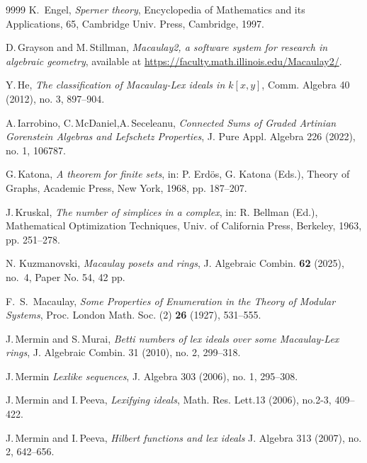 \documentclass[11pt, reqno]{amsart}
\theoremstyle{plain} %
\theoremstyle{definition}
\theoremstyle{remark}
\numberwithin{equation}{section}  %
\begin{document}
\begin{thebibliography}{9999}
 K.\, Engel,  {\em Sperner theory}, Encyclopedia of Mathematics and its Applications, 65, Cambridge Univ. Press, Cambridge, 1997.

D.\,Grayson and M.\,Stillman,  {\em Macaulay2, a software system for research in algebraic geometry},
 available at \url{https://faculty.math.illinois.edu/Macaulay2/}.

 Y.\,He, {\em The classification of Macaulay-Lex ideals in  $k[x,y]$},  Comm. Algebra 40 (2012), no. 3, 897--904.

A.\,Iarrobino, C.\,McDaniel,A.\,Seceleanu,
{\em Connected Sums of Graded Artinian Gorenstein
Algebras and Lefschetz Properties}, J. Pure Appl. Algebra 226 (2022), no. 1, 106787.

 G.\,Katona, {\em A theorem for finite sets}, in: P. Erd\"os, G. Katona (Eds.), Theory of Graphs, Academic Press, New York, 1968, pp. 187--207.  

  J.\,Kruskal, {\em The number of simplices in a complex}, in: R. Bellman (Ed.), Mathematical Optimization Techniques, Univ. of California Press, Berkeley, 1963, pp. 251--278.  
 
N. Kuzmanovski, {\em Macaulay posets and rings}, J. Algebraic Combin. {\bf 62} (2025), no.~4, Paper No. 54, 42 pp.

  F.\, S.\, Macaulay, {\em Some Properties of Enumeration in the Theory of Modular Systems}, Proc. London Math. Soc. (2) {\bf 26} (1927), 531--555.

 J.\,Mermin and S.\,Murai,
{\em Betti numbers of lex ideals over some Macaulay-Lex rings}, 
J. Algebraic Combin. 31 (2010), no. 2, 299--318.

 J.\,Mermin
{\em Lexlike sequences}, 
J. Algebra   303 (2006), no. 1, 295--308.

  J.\,Mermin and I.\,Peeva, {\em Lexifying ideals}, Math. Res. Lett.13 (2006), no.2-3, 409--422.%

J.\,Mermin and I.\,Peeva,
{\em Hilbert functions and lex ideals} J. Algebra   313 (2007), no. 2, 642--656.

\end{thebibliography}

\bigskip

\bigskip
\end{document}
